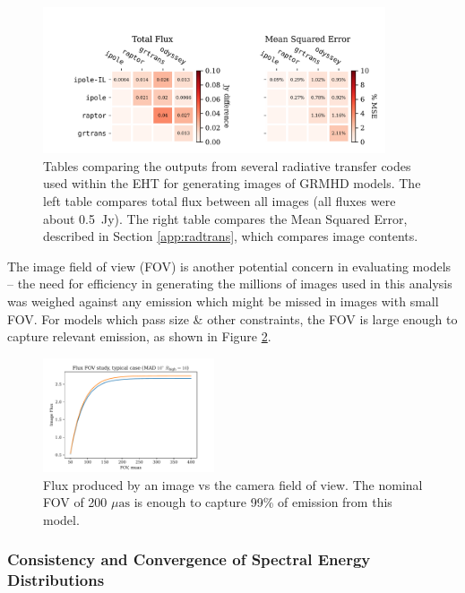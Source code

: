 \begin{figure}
  \centering
  \includegraphics[width=0.9\textwidth]{figures/grmhd_hi_IntegratedUnpolarizeds_plot.pdf}
  \caption{Tables comparing the outputs from several radiative transfer codes used within the EHT for generating images of GRMHD models.  The left table compares total flux between all images (all fluxes were about 0.5~Jy). The right table compares the Mean Squared Error, described in Section \ref{app:radtrans}, which compares image contents.}
  \label{fig:radtrans_grmhd_comp}
\end{figure}

The image field of view (FOV) is another potential concern in evaluating models -- the need for efficiency in generating the millions of images used in this analysis was weighed against any emission which might be missed in images with small FOV. For models which pass size \& other constraints, the FOV is large enough to capture relevant emission, as shown in Figure \ref{fig:radtrans_fov_study}.

\begin{figure}
  \centering
  \includegraphics[width=0.45\textwidth]{figures/fov_study.pdf}
  \caption{Flux produced by an image vs the camera field of view.  The nominal FOV of 200 $\mu\mathrm{as}$ is enough to capture 99\% of emission from this model.}
  \label{fig:radtrans_fov_study}
\end{figure}

\subsubsection{Consistency and Convergence of Spectral Energy Distributions}

